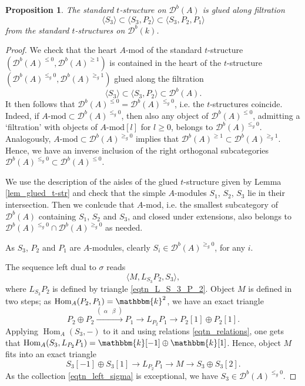 \documentclass[12pt,a4paper]{amsart}
\newcommand{\dD}{{\mathcal{D}}}
\newcommand{\kk}{\mathbbm{k}}
\newcommand{\tr}{{\mbox{$t$-struc}\-tu\-r}}
\newcommand{\Hom}{\mathop{\textrm{Hom}}\nolimits}
\newtheorem{PROP}[LEM]{Proposition}
\theoremstyle{definition}
\begin{document}
\begin{PROP}
	The standard \tr e on $\dD^b(A)$ is glued along filtration 
	$$
	\langle S_3 \rangle  \subset \langle S_3, P_2 \rangle \subset \langle S_3, P_2, P_1 \rangle
	$$
	from the standard \tr es on $\dD^b(k)$.
\end{PROP}
\begin{proof}
	We check that the heart $A\textrm{-mod}$ of the standard \tr e $(\dD^b(A)^{\leq 0}, \dD^b(A)^{\geq 1})$ is contained in the heart of the \tr e $(\dD^b(A)^{\leq_g 0}, \dD^b(A)^{\geq_g 1})$  glued along the filtration
	$$
	\langle S_3\rangle \subset \langle S_3, P_2 \rangle \subset \dD^b(A).
	$$
	It then follows that $\dD^b(A)^{\leq 0} = \dD^b(A)^{\leq_g0}$, i.e. the \tr es coincide.  Indeed, if $A\textrm{-mod}\subset \dD^b(A)^{\leq_g0}$, then also any object of $\dD^b(A)^{\leq 0}$, admitting a `filtration' with objects of $A\textrm{-mod}[l]$ for $l\geq 0$, belongs to $\dD^b(A)^{\leq_g 0}$. Analogously, $A\textrm{-mod}\subset \dD^b(A)^{\geq_g 0}$ implies that $\dD^b(A)^{\geq 1} \subset \dD^b(A)^{\geq_g 1}$. Hence, we have an inverse inclusion of the right orthogonal subcategories $\dD^b(A)^{\leq_g 0} \subset \dD^b(A)^{\leq 0}$. 
	
	We use the description of the aisles of the glued \tr e given by Lemma \ref{lem_glued_t-str} and check that the simple $A$-modules $S_1$, $S_2$, $S_3$ lie in their intersection. Then we conlcude that $A\textrm{-mod}$, i.e. the smallest subcategory of $\dD^b(A)$ containing $S_1$, $S_2$ and $S_3$, and closed under extensions, also belongs to $\dD^b(A)^{\leq_g0} \cap \dD^b(A)^{\geq_g 0}$ as needed.
	
	As $S_3$, $P_2$ and $P_1$ are $A$-modules, clearly $S_i \in \dD^b(A)^{\geq_g 0}$, for any $i$. 
	
The sequence left dual to $\sigma$ reads
\begin{equation} \label{eqtn_left_sigma}
\langle M, L_{S_3}P_2, S_3 \rangle,
\end{equation}
where $L_{S_3}P_2$ is defined by triangle \eqref{eqtn_L_S_3_P_2}. Object $M$ is defined in two steps; as $\Hom_A(P_2,P_1) = \kk^{2}$, we have an exact triangle
\begin{equation}\label{eqtn_L_P_2P_1}
	P_2 \oplus P_2 \xrightarrow{\left(\begin{array} {cc}\alpha & \beta \end{array}\right)} P_1 \to L_{P_2}P_1 \to P_2[1] \oplus P_2[1].
\end{equation}
Applying $\Hom_A(S_3,-)$ to it and using relations \eqref{eqtn_relations}, one gets that $\Hom_A(S_3, L_{P_2}P_1) = \kk[-1] \oplus \kk[1]$. Hence, object $M$ fits into an exact triangle
\begin{equation}\label{eqtn_M}
	S_3[-1] \oplus S_3[1] \to L_{P_2}P_1 \to M \to S_3 \oplus S_3[2].
\end{equation}
As the collection \eqref{eqtn_left_sigma} is exceptional, we have $S_3\in \dD^b(A)^{\leq_g 0}$.


\end{proof}
\end{document}
